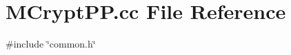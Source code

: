 \section{M\+Crypt\+P\+P.\+cc File Reference}
\label{MCryptPP_8cc}
{\ttfamily \#include \char`\"{}common.\+h\char`\"{}}\newline
